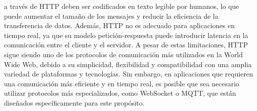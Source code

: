             a trav\'es de HTTP deben ser codificados en texto legible por humanos, lo que puede aumentar el tama\~no 
            de los mensajes y reducir la eficiencia de la transferencia de datos. Adem\'as, HTTP no es adecuado para 
            aplicaciones en tiempo real, ya que su modelo petici\'on-respuesta puede introducir latencia en la 
            comunicaci\'on entre el cliente y el servidor. \cite{RFC2616}
    \vskip 0.5cm
        A pesar de estas limitaciones, HTTP sigue siendo uno de los protocolos de comunicaci\'on m\'as utilizados en 
            la World Wide Web, debido a su simplicidad, flexibilidad y compatibilidad con una amplia variedad de 
            plataformas y tecnolog\'ias. Sin embargo, en aplicaciones que requieren una comunicaci\'on m\'as eficiente 
            y en tiempo real, es posible que sea necesario utilizar protocolos m\'as especializados, como WebSocket o 
            MQTT, que est\'an dise\~nados espec\'ificamente para este prop\'osito. \cite{RFC2616}
